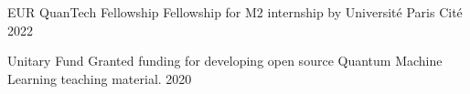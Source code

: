 
\begin{cvhonors}

  \cvhonor
    {EUR QuanTech Fellowship} %
    {Fellowship for M2 internship by Université Paris Cité} %
    {} %
    {2022} %
    
  \cvhonor
    {Unitary Fund} %
    {Granted funding for developing open source Quantum Machine Learning teaching material.} %
    {} %
    {2020} %


\end{cvhonors}